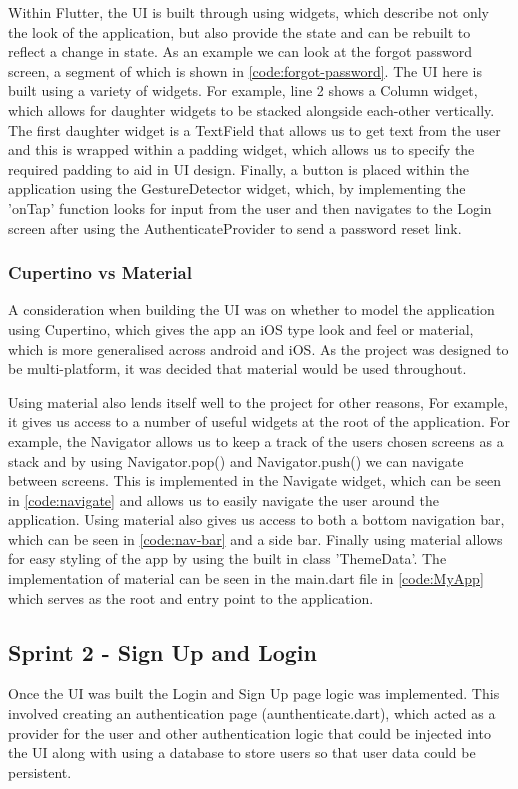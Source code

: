 \documentclass[12pt]{article}
\begin{document}
	Within Flutter, the UI is built through using widgets, which describe not only the look of the application, but also provide the state and can be rebuilt to reflect a change in state. As an example we can look at the forgot password screen, a segment of which is shown in \autoref{code:forgot-password}. The UI here is built using a variety of widgets. For example, line 2 shows a Column widget, which allows for daughter widgets to be stacked alongside each-other vertically. The first daughter widget is a TextField that allows us to get text from the user and this is wrapped within a padding widget, which allows us to specify the required padding to aid in UI design. Finally, a button is placed within the application using the GestureDetector widget, which, by implementing the 'onTap' function looks for input from the user and then navigates to the Login screen after using the AuthenticateProvider to send a password reset link.  
		
	
	\subsubsection{Cupertino vs Material}
	A consideration when building the UI was on whether to model the application using Cupertino, which gives the app an iOS type look and feel or material, which is more generalised across android and iOS. As the project was designed to be multi-platform, it was decided that material would be used throughout. 
	
	Using material also lends itself well to the project for other reasons, For example, it gives us access to a number of useful widgets at the root of the application. For example, the Navigator allows us to keep a track of the users chosen screens as a stack and by using Navigator.pop() and Navigator.push() we can navigate between screens. This is implemented in the Navigate widget, which can be seen in \autoref{code:navigate} and allows us to easily navigate the user around the application. Using material also gives us access to both a bottom navigation bar, which can be seen in \autoref{code:nav-bar} and a side bar. Finally using material allows for easy styling of the app by using the built in class 'ThemeData'. The implementation of material can be seen in the main.dart file in \autoref{code:MyApp} which serves as the root and entry point to the application.
	
	
	
	\subsection{Sprint 2 - Sign Up and Login}
	Once the UI was built the Login and Sign Up page logic was implemented. This involved creating an authentication page (aunthenticate.dart), which acted as a provider for the user and other authentication logic that could be injected into the UI along with using a database to store users so that user data could be persistent.
	
\end{document}
